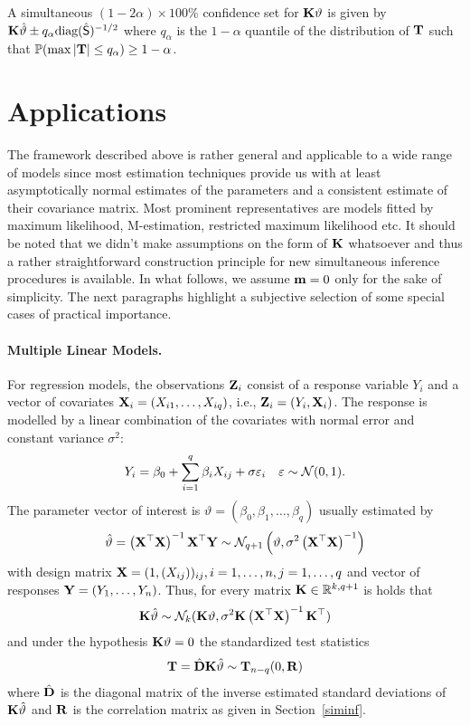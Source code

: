 \documentclass[12pt]{article}
\begin{document}
A simultaneous $(1 - 2\alpha) \times 100\%$ 
confidence set for $\mathbf{K} \vartheta$ is given by 
$\mathbf{K} \hat{\vartheta} \pm q_\alpha \text{diag}(\hat{\textsf{S}})^{-1/2}$
where $q_\alpha$ is the $1 - \alpha$ 
quantile of the distribution of $\mathbf{T}$ 
such that $\mathbb{P}(\max{|\mathbf{T}|} \le q_\alpha) \ge 1 - \alpha$.

\section{Applications} \label{applications}

The framework described above is rather general and applicable 
to a wide range of models since most estimation techniques provide us with 
at least asymptotically normal estimates of the parameters 
and a consistent estimate of their covariance matrix. Most prominent
representatives are models fitted by maximum likelihood, M-estimation,
restricted maximum likelihood etc. 
It should be noted that we didn't make assumptions on the form
of $\mathbf{K}$ whatsoever and thus a rather straightforward construction 
principle for new simultaneous inference procedures is available. In
what follows, we assume $\mathbf{m} = 0$ only for the sake of simplicity.
The next paragraphs highlight a subjective selection of 
some special cases of practical importance.

\paragraph{Multiple Linear Models.}

For regression models, the observations $\mathbf{Z}_i$ consist of a response
variable $Y_i$ and a vector of covariates $\mathbf{X}_i = (X_{i1}, \dots, X_{iq})$, 
i.e., $\mathbf{Z}_i = (Y_i, \mathbf{X}_i)$. The response is modelled by a linear
combination of the covariates with normal error and constant variance $\sigma^2$:
\begin{eqnarray*}
Y_i = \beta_0 + \sum_{i = 1}^q \beta_i X_{ij} + \sigma \varepsilon_i \quad 
      \varepsilon \sim \mathcal{N}(0, 1).
\end{eqnarray*}
The parameter vector of interest is $\vartheta = (\beta_0, \beta_1, \dots, \beta_q)$
usually estimated by 
\begin{eqnarray*}
\hat{\vartheta} = \left(\mathbf{X}^\top\mathbf{X}\right)^{-1} \mathbf{X}^\top \mathbf{Y} 
\sim \mathcal{N}_{q+1}\left(\vartheta, \sigma^2 \left(\mathbf{X}^\top\mathbf{X}\right)^{-1}\right)
\end{eqnarray*}
with design matrix $\mathbf{X} = (1, (X_{ij}))_{ij}, i = 1, \dots, n, j = 1, \dots, q$ and
vector of responses $\mathbf{Y} = (Y_1, \dots, Y_n)$. Thus,
for every matrix $\mathbf{K} \in \mathbb{R}^{k,q+1}$ is holds that
\begin{eqnarray*}
\mathbf{K} \hat{\vartheta} \sim \mathcal{N}_k(\mathbf{K} \vartheta, \sigma^2 \mathbf{K} \left(\mathbf{X}^\top\mathbf{X}\right)^{-1} \mathbf{K}^\top)
\end{eqnarray*}
and under the hypothesis $\mathbf{K} \vartheta = 0$ the standardized test statistics
\begin{eqnarray*}
\mathbf{T} = \hat{\mathbf{D}} \mathbf{K} \hat{\vartheta} \sim \mathbf{T}_{n - q}(0, \mathbf{R})
\end{eqnarray*}
where $\hat{\mathbf{D}}$ is the diagonal matrix of the inverse estimated 
standard deviations of $\mathbf{K} \hat{\vartheta}$ and $\mathbf{R}$ is the correlation matrix
as given in Section~\ref{siminf}.
\end{document}
